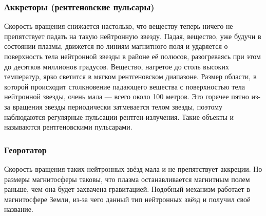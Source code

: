 \subsubsection{Аккреторы (рентгеновские пульсары)}

Скорость вращения снижается настолько, что веществу теперь ничего не препятствует падать на такую нейтронную звезду. Падая, вещество, уже будучи в состоянии плазмы, движется по линиям магнитного поля и ударяется о поверхность тела нейтронной звезды в районе её полюсов, разогреваясь при этом до десятков миллионов градусов. Вещество, нагретое до столь высоких температур, ярко светится в мягком рентгеновском диапазоне. Размер области, в которой происходит столкновение падающего вещества с поверхностью тела нейтронной звезды, очень мала — всего около 100 метров. Это горячее пятно из-за вращения звезды периодически затмевается телом звезды, поэтому наблюдаются регулярные пульсации рентген-излучения. Такие объекты и называются рентгеновскими пульсарами.

\subsubsection{Георотатор}

Скорость вращения таких нейтронных звёзд мала и не препятствует аккреции. Но размеры магнитосферы таковы, что плазма останавливается магнитным полем раньше, чем она будет захвачена гравитацией. Подобный механизм работает в магнитосфере Земли, из-за чего данный тип нейтронных звёзд и получил своё название.


